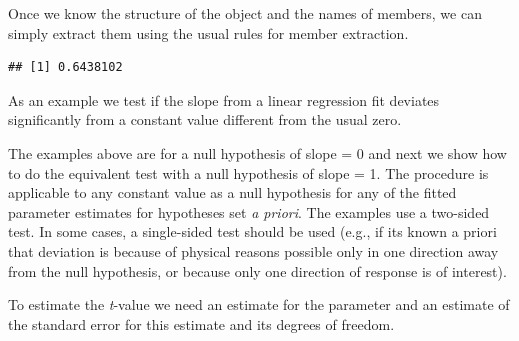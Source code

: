 \documentclass[krantz2]{krantz}\usepackage{knitr}
\begin{document}
\begin{explainbox}
Once we know the structure of the object and the names of members, we can simply extract them using the usual \Rlang rules for member extraction.

\begin{knitrout}\footnotesize
{}\color{fgcolor}\begin{kframe}
\begin{alltt}
\hlopt{$}
\end{alltt}
\begin{verbatim}
## [1] 0.6438102
\end{verbatim}
\end{kframe}
\end{knitrout}

As an example we test if the slope from a linear regression fit deviates significantly from a constant value different from the usual zero.

The examples above are for a null hypothesis of slope = 0 and next we show how to do the equivalent test with a null hypothesis of slope = 1. The procedure is applicable to any constant value as a null hypothesis for any of the fitted parameter estimates for hypotheses set \emph{a priori}. The examples use a two-sided test. In some cases, a single-sided test should be used (e.g., if its known a priori that deviation is because of physical reasons possible only in one direction away from the null hypothesis, or because only one direction of response is of interest).

To estimate the \emph{t}-value we need an estimate for the parameter and an estimate of the standard error for this estimate and its degrees of freedom.

\begin{knitrout}\footnotesize
{}\color{fgcolor}\begin{kframe}
\begin{alltt}
 \hlkwb{<-} \hlopt{$}\hlstd{coef[}\hlstd{,} \hlstd{]}
 \hlkwb{<-} \hlopt{$}\hlstd{coef[}\hlstd{,} \hlstd{]}
 \hlkwb{<-} \hlopt{$}\hlstd{df[}\hlstd{]}
\end{alltt}
\end{kframe}
\end{knitrout}


\end{explainbox}
\end{document}
